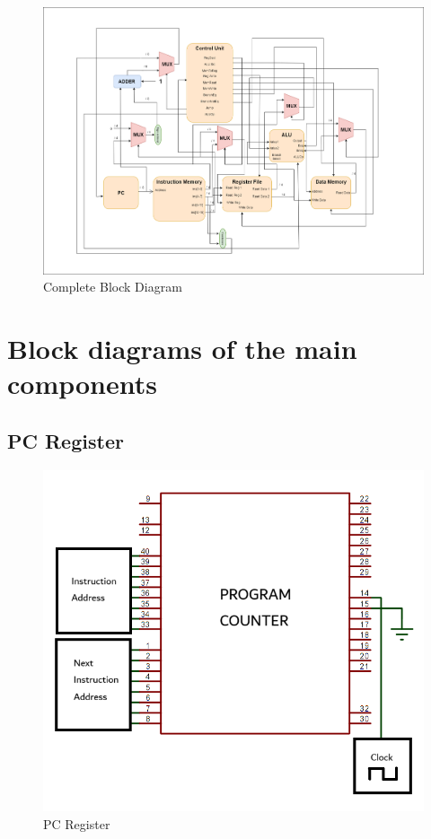 \documentclass{article}
\begin{document}
		\begin{figure}[h]
			\centering
			\includegraphics[scale=0.3]{images/block3.png}
			\caption{Complete Block Diagram}
			\label{fig:enter-label}
		\end{figure}
		
		
		\newpage
		
		
		
		
		\section{\large{Block diagrams of the main components}}
		
		\subsection{PC Register}
		
		\begin{figure}[h]
			\centering
			\includegraphics[scale=0.9]{images/pc.png}
			\caption{PC Register}
			\label{fig:enter-label}
		\end{figure}
		
\end{document}
